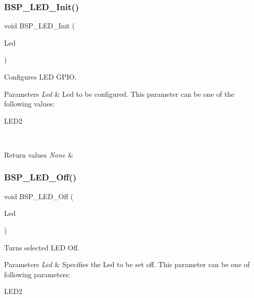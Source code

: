 \subsubsection{\texorpdfstring{B\+S\+P\+\_\+\+L\+E\+D\+\_\+\+Init()}{BSP\_LED\_Init()}}
{\footnotesize\ttfamily void B\+S\+P\+\_\+\+L\+E\+D\+\_\+\+Init (\begin{DoxyParamCaption}\item[{Led\+\_\+\+Type\+Def}]{Led }\end{DoxyParamCaption})}



Configures L\+ED G\+P\+IO. 


\begin{DoxyParams}{Parameters}
{\em Led} & Led to be configured. This parameter can be one of the following values\+: \begin{DoxyItemize}
\item L\+E\+D2 \end{DoxyItemize}
\\
\hline
\end{DoxyParams}

\begin{DoxyRetVals}{Return values}
{\em None} & \\
\hline
\end{DoxyRetVals}
\mbox{\label{group___s_t_m32_f0_x_x___n_u_c_l_e_o___l_e_d___functions_gaef268680154ca15c45066d64d41f9467}} 
\subsubsection{\texorpdfstring{B\+S\+P\+\_\+\+L\+E\+D\+\_\+\+Off()}{BSP\_LED\_Off()}}
{\footnotesize\ttfamily void B\+S\+P\+\_\+\+L\+E\+D\+\_\+\+Off (\begin{DoxyParamCaption}\item[{Led\+\_\+\+Type\+Def}]{Led }\end{DoxyParamCaption})}



Turns selected L\+ED Off. 


\begin{DoxyParams}{Parameters}
{\em Led} & Specifies the Led to be set off. This parameter can be one of following parameters\+: \begin{DoxyItemize}
\item L\+E\+D2 \end{DoxyItemize}
\\
\hline
\end{DoxyParams}

